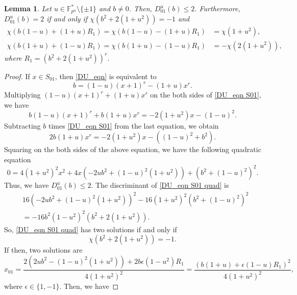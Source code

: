 \documentclass[11pt]{article}
\numberwithin{theorem}{section}
\newtheorem{lemma}[theorem]{Lemma}
\newcommand{\Fpnmul}{\mathbb{F}_{p^n}^*}
\begin{document}
\begin{lemma}\label{DU_lemma S01}
	Let $u\in \Fpnmul \setminus \{\pm1\}$ and $b\ne 0$. Then, $D_{01}^u(b)\le 2$. Furthermore, $D_{01}^u(b) = 2$ if and only if $\chi(b^2+2(1+u^2))=-1$ and 
	\begin{align*}
		\chi(b(1-u)+(1+u)R_1) = \chi(b(1-u)-(1+u)R_1) &= \chi(1+u^2),\\
		\chi(b(1+u)+(1-u)R_1) = \chi(b(1+u)-(1-u)R_1) &= -\chi(2(1+u^2)),
	\end{align*}
	where $R_1  = (b^2+2(1+u^2))^r$.
\end{lemma}

\begin{proof}
If $x\in S_{01}$, then \eqref{DU_eqn} is equivalent to 
\begin{equation}\label{DU_eqn S01}
	b = (1- u)(x+1)^r- (1+u)x^r.  
\end{equation}
Multiplying $(1- u)(x+1)^r+ (1+u)x^r$ on the both sides of \eqref{DU_eqn S01}, we have 
\begin{equation*}
	b(1-u)(x+1)^r + b(1+u)x^r = -2(1+u^2)x - (1-u)^2.
\end{equation*}
Subtracting $b$ times \eqref{DU_eqn S01} from the last equation, we obtain 
\begin{equation*}
	2b(1+u)x^r = - 2(1+u^2)x - ((1-u)^2+b^2).
\end{equation*}
Squaring on the both sides of the above equation, we have the following quadratic equation
\begin{equation}\label{DU_eqn S01 quad}
	0=4(1+u^2)^2x^2+4x\left( -2ub^2 +(1-u)^2(1+u^2) \right) +\left( b^2 +(1-u)^2\right)^2. 
\end{equation}
Thus, we have $D_{01}^u(b) \le 2$. The discriminant of \eqref{DU_eqn S01 quad} is 
\begin{align*}
	&16\left( - 2ub^2 +(1-u)^2(1+u^2) \right)^2-16(1+u^2)^2\left( b^2 +(1-u)^2\right)^2\\
	&= -16b^2(1-u^2)^2\left( b^2+2(1+u^2) \right).
\end{align*}
So, \eqref{DU_eqn S01 quad} has two solutions if and only if 
\begin{equation*}
	\chi\left( b^2+2(1+u^2) \right)=-1.
\end{equation*}
If then, two solutions are
\begin{equation}
	x_{01}=\frac{2\left(2ub^2-(1-u)^2(1+u^2)\right)+2b\epsilon(1-u^2)R_1}{4(1+u^2)^2}=\frac{\left( b(1+u)+\epsilon(1-u)R_1\right) ^2}{4(1+u^2)^2}, \label{DU_eqn sol S01}
\end{equation}
where $\epsilon\in \{1,-1\}$. Then, we have

\end{proof}
\end{document}
